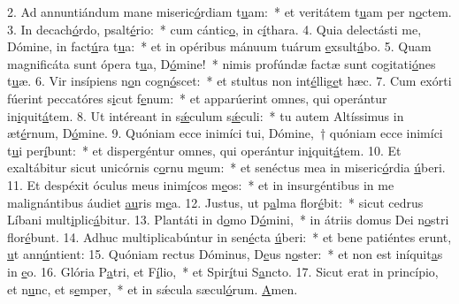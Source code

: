 2. Ad annuntiándum mane miseric\uline{ó}rdiam t\uline{u}am:~* et veritátem t\uline{u}am per n\uline{o}ctem.
3. In decach\uline{ó}rdo, psalt\uline{é}rio:~* cum cántic\uline{o}, in c\uline{í}thara.
4. Quia delectásti me, Dómine, in fact\uline{ú}ra t\uline{u}a:~* et in opéribus mánuum tuárum \uline{e}xsult\uline{á}bo.
5. Quam magnificáta sunt ópera t\uline{u}a, D\uline{ó}mine!~* nimis profúndæ factæ sunt cogitati\uline{ó}nes t\uline{u}æ.
6. Vir insípiens n\uline{o}n cogn\uline{ó}scet:~* et stultus non int\uline{é}llig\uline{e}t hæc.
7. Cum exórti fúerint peccatóres s\uline{i}cut f\uline{e}num:~* et apparúerint omnes, qui operántur in\uline{i}quit\uline{á}tem.
8. Ut intéreant in s\uline{ǽ}culum s\uline{ǽ}culi:~* tu autem Altíssimus in æt\uline{é}rnum, D\uline{ó}mine.
9. Quóniam ecce inimíci tui, Dómine,~† quóniam ecce inimíci t\uline{u}i per\uline{í}bunt:~* et dispergéntur omnes, qui operántur in\uline{i}quit\uline{á}tem.
10. Et exaltábitur sicut unicórnis c\uline{o}rnu m\uline{e}um:~* et senéctus mea in miseric\uline{ó}rdia \uline{ú}beri.
11. Et despéxit óculus meus inim\uline{í}cos m\uline{e}os:~* et in insurgéntibus in me malignántibus áudiet \uline{au}ris m\uline{e}a.
12. Justus, ut p\uline{a}lma flor\uline{é}bit:~* sicut cedrus Líbani mult\uline{i}plic\uline{á}bitur.
13. Plantáti in d\uline{o}mo D\uline{ó}mini,~* in átriis domus Dei n\uline{o}stri flor\uline{é}bunt.
14. Adhuc multiplicabúntur in sen\uline{é}cta \uline{ú}beri:~* et bene patiéntes erunt, \uline{u}t ann\uline{ú}ntient:
15. Quóniam rectus Dóminus, D\uline{e}us n\uline{o}ster:~* et non est iníquit\uline{a}s in \uline{e}o.
16. Glória P\uline{a}tri, et F\uline{í}lio,~* et Spir\uline{í}tui S\uline{a}ncto.
17. Sicut erat in princípio, et n\uline{u}nc, et s\uline{e}mper,~* et in sǽcula sæcul\uline{ó}rum. \uline{A}men.
